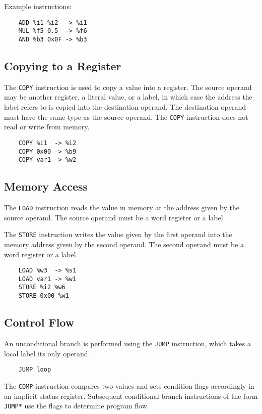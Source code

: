 Example instructions:

\begin{verbatim}
    ADD %i1 %i2  -> %i1
    MUL %f5 0.5  -> %f6
    AND %b3 0x0F -> %b3
\end{verbatim}

\subsection{Copying to a Register}

The \texttt{COPY} instruction is used to copy a value into
a register. The source operand may be another register,
a literal value, or a label, in which case the address
the label refers to is copied into the destination operand.
The destination operand must have the same type as the source operand.
The \texttt{COPY} instruction does not read or write from memory.

\begin{verbatim}
    COPY %i1  -> %i2
    COPY 0x00 -> %b9
    COPY var1 -> %w2
\end{verbatim}

\subsection{Memory Access}

The \texttt{LOAD} instruction reads the value in memory
at the address given by the source operand. The source operand
must be a word register or a label.

The \texttt{STORE} instruction writes the value given by
the first operand into the memory address given by the
second operand. The second operand must be a word register
or a label.

\begin{verbatim}
    LOAD %w3  -> %s1
    LOAD var1 -> %w1
    STORE %i2 %w6
    STORE 0x00 %w1
\end{verbatim}

\subsection{Control Flow}

An unconditional branch is performed using the \texttt{JUMP} instruction, which
takes a local label its only operand.

\begin{verbatim}
    JUMP loop
\end{verbatim}

The \texttt{COMP} instruction compares two values and sets condition flags
accordingly in an implicit status register. Subsequent conditional branch instructions of the
form \texttt{JUMP*} use the flags to determine program flow.

